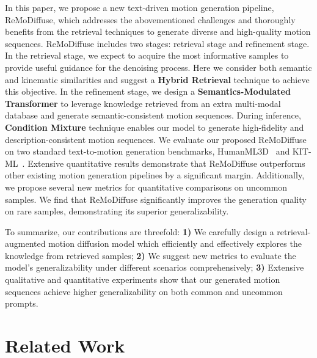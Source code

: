 \documentclass[10pt,twocolumn,letterpaper]{article}
\newcommand{\name}{ReMoDiffuse\xspace}
\begin{document}
In this paper, we propose a new text-driven motion generation pipeline,  \name, which addresses the abovementioned challenges and thoroughly benefits from the retrieval techniques to generate diverse and high-quality motion sequences. \name includes two stages: retrieval stage and refinement stage. In the retrieval stage, we expect to acquire the most informative samples to provide useful guidance for the denoising process. Here we consider both semantic and kinematic similarities and suggest a \textbf{Hybrid Retrieval} technique to achieve this objective. In the refinement stage, we design a \textbf{Semantics-Modulated Transformer} to leverage knowledge retrieved from an extra multi-modal database and generate semantic-consistent motion sequences. During inference, \textbf{Condition Mixture} technique enables our model to generate high-fidelity and description-consistent motion sequences. We evaluate our proposed \name on two standard text-to-motion generation benchmarks, HumanML3D~\cite{guo2022generating} and KIT-ML~\cite{plappert2016kit}. Extensive quantitative results demonstrate that \name outperforms other existing motion generation pipelines by a significant margin. Additionally,  we propose several new metrics for quantitative comparisons on uncommon samples. We find that \name significantly improves the generation quality on rare samples, demonstrating its superior generalizability.


To summarize, our contributions are threefold: \textbf{1)} We carefully design a retrieval-augmented motion diffusion model which efficiently and effectively explores the knowledge from retrieved samples; \textbf{2)} We suggest new metrics to evaluate the model's generalizability under different scenarios comprehensively; \textbf{3)} Extensive qualitative and quantitative experiments show that our generated motion sequences achieve higher generalizability on both common and uncommon prompts. \section{Related Work}
\end{document}
